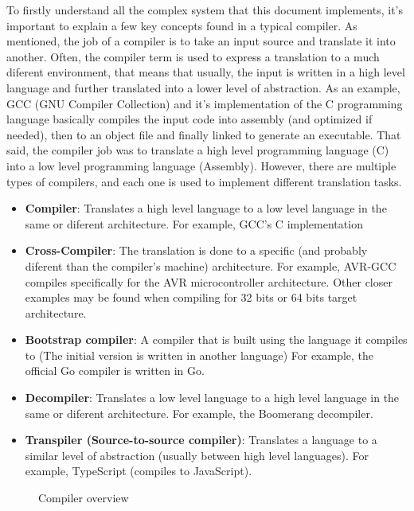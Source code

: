 To firstly understand all the complex system that this document implements, it's important to explain a few key concepts
found in a typical compiler. As mentioned, the job of a compiler is to take an input source and translate it into
another. Often, the compiler term is used to express a translation to a much diferent environment, that means that usually, the input
is written in a high level language and further translated into a lower level of abstraction. As an example, GCC (GNU Compiler Collection) and
it's implementation of the C programming language basically compiles the input code into assembly (and optimized if needed), then to an object file and finally linked
to generate an executable. That said, the compiler job was to translate a high level programming language (C) into a low level programming language (Assembly).
However, there are multiple types of compilers, and each one is used to implement different translation tasks.

\begin{itemize}
    \item \textbf{Compiler}: Translates a high level language to a low level language in the same or diferent architecture.
        For example, GCC's C implementation
    \item \textbf{Cross-Compiler}: The translation is done to a specific (and probably diferent than the compiler's machine) architecture.
        For example, AVR-GCC compiles specifically for the AVR microcontroller architecture. Other closer examples may be found when compiling for
        32 bits or 64 bits target architecture.
    \item \textbf{Bootstrap compiler}: A compiler that is built using the language it compiles to (The initial version is written in another language)
        For example, the official Go compiler is written in Go.
    \item \textbf{Decompiler}: Translates a low level language to a high level language in the same or diferent architecture.
        For example, the Boomerang decompiler.
    \item \textbf{Transpiler (Source-to-source compiler)}: Translates a language to a similar level of abstraction (usually between high level languages).
        For example, TypeScript (compiles to JavaScript).
\end{itemize}

\begin{figure}[H]
    \centering

    \caption{Compiler overview}
    \label{fig:compiler_overview}
\end{figure}

